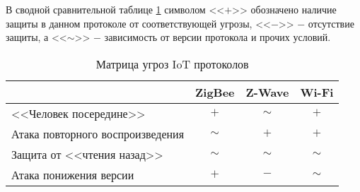	В сводной сравнительной таблице \ref{table-threat-matrix} символом <<$+$>> обозначено наличие защиты в данном протоколе
	от соответствующей угрозы, <<$-$>> $-$ отсутствие защиты, а <<$\sim$>> $-$ зависимость от версии
	протокола и прочих условий.
	
	\begin{table}[h]
		\centering
		\caption{Матрица угроз IoT протоколов}
		\begin{tabular}{ | l | l | l | l | }
			\hline
			& ZigBee & Z-Wave & Wi-Fi \\ \hline
			<<Человек посередине>> & \multicolumn{1}{c|}{$+$} & \multicolumn{1}{c|}{$\sim$} & \multicolumn{1}{c|}{$+$} \\ \hline
			Атака повторного воспроизведения & \multicolumn{1}{c|}{$\sim$} &\multicolumn{1}{c|}{$+$} & \multicolumn{1}{c|}{$+$} \\ \hline
			Защита от <<чтения назад>> & \multicolumn{1}{c|}{$\sim$} & \multicolumn{1}{c|}{$\sim$} & \multicolumn{1}{c|}{$\sim$} \\ \hline
			Атака понижения версии & \multicolumn{1}{c|}{$+$} & \multicolumn{1}{c|}{$-$} & \multicolumn{1}{c|}{$\sim$} \\
			\hline
		\end{tabular}
		\label{table-threat-matrix}
	\end{table}
	